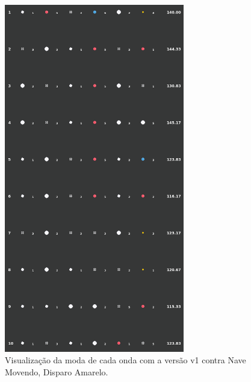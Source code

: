 \begin{figure}[H]
  \centering
  \includegraphics[width=0.7\textwidth]{figuras/ss/ss_yellowmove_ai_mode_1_1.png}
  \caption{Visualização da moda de cada onda com a versão v1 contra Nave Movendo, Disparo Amarelo.}
  \label{fig:ss-moda-ym-1-1}
\end{figure}

